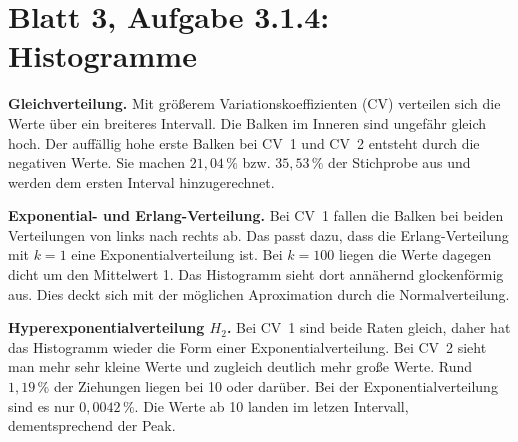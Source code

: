 \documentclass[a4paper,11pt]{article}
\begin{document}
\section*{Blatt 3, Aufgabe 3.1.4: Histogramme}

\textbf{Gleichverteilung.}
Mit größerem Variationskoeffizienten (CV) verteilen sich die Werte über ein
breiteres Intervall. Die Balken im Inneren sind ungefähr gleich hoch. Der
auffällig hohe erste Balken bei CV~1 und CV~2 entsteht durch die negativen
Werte. Sie machen \(21{,}04\,\%\) bzw. \(35{,}53\,\%\) der Stichprobe aus und
werden dem ersten Interval hinzugerechnet.

\medskip
\noindent\textbf{Exponential- und Erlang-Verteilung.}
Bei CV~1 fallen die Balken bei beiden Verteilungen von links nach rechts ab.
Das passt dazu, dass die Erlang-Verteilung mit \(k=1\) eine
Exponentialverteilung ist. Bei \(k=100\) liegen die Werte dagegen dicht um den
Mittelwert 1. Das Histogramm sieht dort annähernd glockenförmig aus. Dies deckt sich mit der möglichen Aproximation durch die Normalverteilung.

\medskip
\noindent\textbf{Hyperexponentialverteilung \(H_2\).}
Bei CV~1 sind beide Raten gleich, daher hat das Histogramm wieder die Form
einer Exponentialverteilung. Bei CV~2 sieht man mehr sehr kleine Werte und
zugleich deutlich mehr große Werte. Rund \(1{,}19\,\%\) der Ziehungen liegen
bei 10 oder darüber. Bei der Exponentialverteilung sind es nur
\(0{,}0042\,\%\). Die Werte ab 10 landen im letzen Intervall, dementsprechend der Peak.
\end{document}
